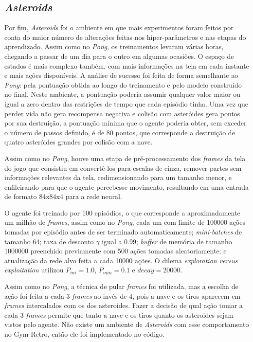 \subsection{\textit{Asteroids}}
\label{sec:exp_asteroids}

Por fim, \textit{Asteroids} foi o ambiente em que mais experimentos foram feitos por conta do maior número de alterações feitas nos hiper-parâmetros e nas etapas do aprendizado.
Assim como no \textit{Pong}, os treinamentos levaram várias horas, chegando a passar de um dia para o outro em algumas ocasiões.
O espaço de estados é mais complexo também, com mais informações na tela em cada instante e mais ações disponíveis.
A análise de sucesso foi feita de forma semelhante ao \textit{Pong}: pela pontuação obtida ao longo do treinamento e pelo modelo construído no final.
Neste ambiente, a pontuação poderia assumir qualquer valor maior ou igual a zero dentro das restrições de tempo que cada episódio tinha.
Uma vez que perder vida não gera recompensa negativa e colisão com asteróides gera pontos por sua destruição, a pontuação mínima que o agente poderia obter, sem exceder o número de passos definido, é de 80 pontos, que corresponde a destruição de quatro asteróides grandes por colisão com a nave.

Assim como no \textit{Pong}, houve uma etapa de pré-processamento dos \textit{frames} da tela do jogo que consistiu em convertê-los para escalas de cinza, remover partes sem informações relevantes da tela, redimensionando para um tamanho menor, e enfileirando para que o agente percebesse movimento, resultando em uma entrada de formato 84x84x4 para a rede neural.

O agente foi treinado por 100 episódios, o que corresponde a aproximadamente um milhão de \textit{frames}, assim como no \textit{Pong}, cada um com limite de 100000 ações tomadas por episódio antes de ser terminado automaticamente;
\textit{mini-batches} de tamanho 64;
taxa de desconto $\gamma$ igual a 0.99;
\textit{buffer} de memória de tamanho 1000000 preenchido previamente com 500 ações tomadas aleatoriamente;
e atualização da rede alvo feita a cada 10000 ações.
O dilema \textit{exploration versus exploitation} utilizou $P_{ini} = 1.0$, $P_{min} = 0.1$ e $decay = 20000$.

Assim como no \textit{Pong}, a técnica de pular \textit{frames} foi utilizada, mas a escolha de ação foi feita a cada 3 \textit{frames} ao invés de 4, pois a nave e os tiros aparecem em \textit{frames} intercalados com os dos asteroides.
Fazer a decisão de qual ação tomar a cada 3 \textit{frames} permite que tanto a nave e os tiros quanto os asteroides sejam vistos pelo agente.
Não existe um ambiente de \textit{Asteroids} com esse comportamento no Gym-Retro, então ele foi implementado no código.

